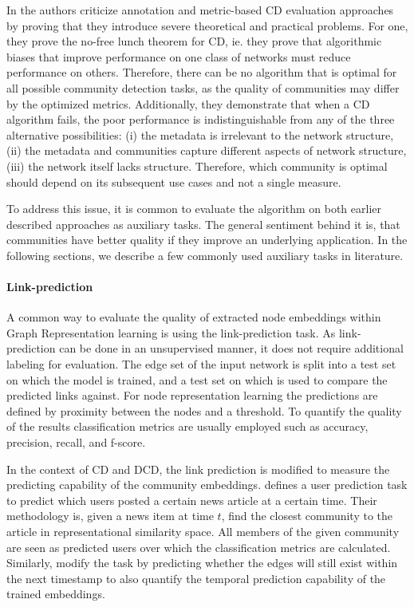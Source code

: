 \documentclass[
acmsmall,
nonacm,
screen,
acmthm]{acmart}
\begin{document}
In \citep{peelGroundTruthMetadata2017} the authors criticize annotation
and metric-based CD evaluation approaches by proving that they introduce
severe theoretical and practical problems. For one, they prove the
no-free lunch theorem for CD, ie. they prove that algorithmic biases
that improve performance on one class of networks must reduce
performance on others. Therefore, there can be no algorithm that is
optimal for all possible community detection tasks, as the quality of
communities may differ by the optimized metrics. Additionally, they
demonstrate that when a CD algorithm fails, the poor performance is
indistinguishable from any of the three alternative possibilities: (i)
the metadata is irrelevant to the network structure, (ii) the metadata
and communities capture different aspects of network structure, (iii)
the network itself lacks structure. Therefore, which community is
optimal should depend on its subsequent use cases and not a single
measure.

To address this issue, it is common to evaluate the algorithm on both
earlier described approaches as auxiliary tasks. The general sentiment
behind it is, that communities have better quality if they improve an
underlying application. In the following sections, we describe a few
commonly used auxiliary tasks in literature.

\hypertarget{link-prediction}{%
\paragraph{Link-prediction}\label{link-prediction}}

A common way to evaluate the quality of extracted node embeddings within
Graph Representation learning is using the link-prediction task. As
link-prediction can be done in an unsupervised manner, it does not
require additional labeling for evaluation. The edge set of the input
network is split into a test set on which the model is trained, and a
test set on which is used to compare the predicted links against. For
node representation learning the predictions are defined by proximity
between the nodes and a threshold. To quantify the quality of the
results classification metrics are usually employed such as accuracy,
precision, recall, and f-score.

In the context of CD and DCD, the link prediction is modified to measure
the predicting capability of the community embeddings.
\citet{faniUserCommunityDetection2020} defines a user prediction task to
predict which users posted a certain news article at a certain time.
Their methodology is, given a news item at time \(t\), find the closest
community to the article in representational similarity space. All
members of the given community are seen as predicted users over which
the classification metrics are calculated. Similarly,
\citet{maCommunityawareDynamicNetwork2020} modify the task by predicting
whether the edges will still exist within the next timestamp to also
quantify the temporal prediction capability of the trained embeddings.
\end{document}
